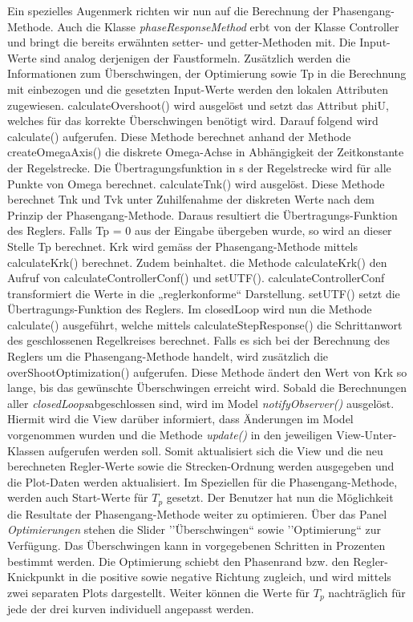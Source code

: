 Ein spezielles Augenmerk richten wir nun auf die Berechnung der Phasengang-Methode. Auch die Klasse \textit{phaseResponseMethod }  erbt von der Klasse Controller und bringt die bereits erw\"ahnten setter- und getter-Methoden mit. Die Input-Werte sind analog derjenigen der Faustformeln. Zus\"atzlich werden die Informationen zum \"Uberschwingen, der Optimierung sowie Tp in die Berechnung mit einbezogen und die gesetzten Input-Werte werden den lokalen Attributen zugewiesen. calculateOvershoot() wird ausgel\"ost und setzt das Attribut phiU, welches f\"ur das korrekte \"Uberschwingen ben\"otigt wird. Darauf folgend wird calculate() aufgerufen. Diese Methode berechnet anhand der Methode createOmegaAxis() die diskrete Omega-Achse in Abh\"angigkeit der Zeitkonstante der Regelstrecke. Die \"Ubertragungsfunktion in s der Regelstrecke wird f\"ur alle Punkte von Omega berechnet. calculateTnk() wird ausgel\"ost. Diese Methode berechnet Tnk und Tvk unter Zuhilfenahme der diskreten Werte nach dem Prinzip der Phasengang-Methode. Daraus resultiert die \"Ubertragungs-Funktion des Reglers. Falls Tp = 0 aus der Eingabe \"ubergeben wurde, so wird an dieser Stelle Tp berechnet. Krk wird gem\"ass der Phasengang-Methode mittels calculateKrk() berechnet. Zudem beinhaltet. die Methode calculateKrk() den Aufruf von calculateControllerConf() und setUTF(). calculateControllerConf transformiert die Werte in die „reglerkonforme“ Darstellung. setUTF() setzt die \"Ubertragungs-Funktion des Reglers.
Im closedLoop wird nun die Methode calculate() ausgef\"uhrt, welche mittels calculateStepResponse() die Schrittanwort des geschlossenen Regelkreises berechnet. Falls es sich bei der Berechnung des Reglers um die Phasengang-Methode handelt, wird zus\"atzlich die overShootOptimization() aufgerufen. Diese Methode \"andert den Wert von Krk so lange, bis das gew\"unschte \"Uberschwingen erreicht wird.
Sobald die Berechnungen aller \textit{closedLoops}abgeschlossen sind, wird im Model \textit{notifyObserver()} ausgel\"ost. Hiermit wird die View  dar\"uber informiert, dass \"Anderungen im Model vorgenommen wurden und die Methode \textit{update()} in den jeweiligen View-Unter-Klassen aufgerufen werden soll. Somit aktualisiert sich die View und die neu berechneten Regler-Werte sowie die Strecken-Ordnung werden ausgegeben und die Plot-Daten werden aktualisiert. Im Speziellen f\"ur die Phasengang-Methode, werden auch Start-Werte f\"ur $T_p$ gesetzt.
Der Benutzer hat nun die M\"oglichkeit die Resultate der Phasengang-Methode weiter zu optimieren. \"Uber das Panel \textit{Optimierungen} stehen die Slider ’’\"Uberschwingen“ sowie ’’Optimierung“ zur Verf\"ugung. Das \"Uberschwingen kann in vorgegebenen Schritten in Prozenten bestimmt werden. Die Optimierung schiebt den Phasenrand bzw. den Regler-Knickpunkt in die positive sowie negative Richtung zugleich, und wird mittels zwei separaten Plots dargestellt. Weiter k\"onnen die Werte f\"ur $T_p$ nachtr\"aglich f\"ur jede der drei kurven individuell angepasst werden.
